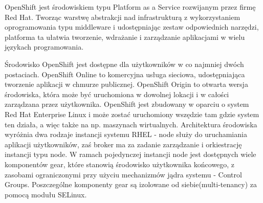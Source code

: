 
\label{sec:openShift}

OpenShift jest środowiskiem typu Platform as a Service rozwijanym przez firmę Red Hat. Tworząc warstwę abstrakcji nad infrastrukturą z wykorzystaniem oprogramowania typu middleware i udostępniając zestaw odpowiednich narzędzi, platforma ta ułatwia tworzenie, wdrażanie i zarządzanie aplikacjami w wielu językach programowania. 

Środowisko OpenShift jest dostępne dla użytkowników w co najmniej dwóch postaciach. OpenShift Online to komercyjna usługa sieciowa, udostępniająca tworzenie aplikacji w chmurze publicznej. OpenShift Origin to otwarta wersja środowiska, która może być uruchomiona w dowolnej lokacji i w całości zarządzana przez użytkownika.
OpenShift jest zbudowany w oparciu o system Red Hat Enterprise Linux i może zostać uruchomiony wszędzie tam gdzie system ten działa, a więc także na np. maszynach wirtualnych. Architektura środowiska wyróżnia dwa rodzaje instancji systemu RHEL - node służy do uruchamiania aplikacji użytkowników, zaś broker ma za zadanie zarządzanie i orkiestrację instancji typu node. W ramach pojedynczej instancji node jest dostępnych wiele komponentów gear, które stanowią środowisko użytkownika końcowego, z zasobami ograniczonymi przy użyciu mechanizmów jądra systemu - Control Groups. Poszczególne komponenty gear są izolowane od siebie(multi-tenancy) za pomocą modułu SELinux. 

